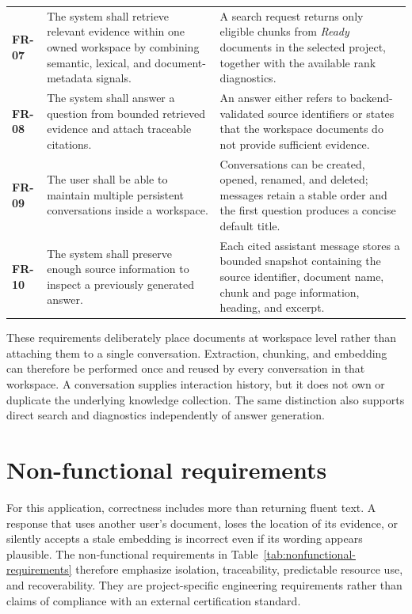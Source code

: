 {\begin{longtable}{@{}L{1.2cm}L{7.9cm}L{4.6cm}@{}}
\textbf{FR-07} &
The system shall retrieve relevant evidence within one owned workspace by
combining semantic, lexical, and document-metadata signals. &
A search request returns only eligible chunks from \emph{Ready} documents in
the selected project, together with the available rank diagnostics. \\

\textbf{FR-08} &
The system shall answer a question from bounded retrieved evidence and attach
traceable citations. &
An answer either refers to backend-validated source identifiers or states that
the workspace documents do not provide sufficient evidence. \\

\textbf{FR-09} &
The user shall be able to maintain multiple persistent conversations inside a
workspace. &
Conversations can be created, opened, renamed, and deleted; messages retain a
stable order and the first question produces a concise default title. \\

\textbf{FR-10} &
The system shall preserve enough source information to inspect a previously
generated answer. &
Each cited assistant message stores a bounded snapshot containing the source
identifier, document name, chunk and page information, heading, and excerpt. \\
\end{longtable}
}

These requirements deliberately place documents at workspace level rather than
attaching them to a single conversation. Extraction, chunking, and embedding
can therefore be performed once and reused by every conversation in that
workspace. A conversation supplies interaction history, but it does not own or
duplicate the underlying knowledge collection. The same distinction also
supports direct search and diagnostics independently of answer generation.

\section{Non-functional requirements}
\label{sec:non-functional-requirements}

For this application, correctness includes more than returning fluent text. A
response that uses another user's document, loses the location of its evidence,
or silently accepts a stale embedding is incorrect even if its wording appears
plausible. The non-functional requirements in
Table~\ref{tab:nonfunctional-requirements} therefore emphasize isolation,
traceability, predictable resource use, and recoverability. They are
project-specific engineering requirements rather than claims of compliance
with an external certification standard.

